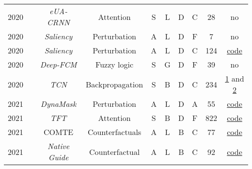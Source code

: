 \begin{table*}[h!]
\begin{tabular}{@{}cccccccccc@{}}
    2020        & \cite{tan_explainable_2021}                 &\textit{\footnotesize{eUA-CRNN}}  & Attention     &S       & L         & D      & C                                & 28                & no\\  

    2020        & \cite{pan_series_2020}           &\textit{Saliency}& Perturbation    &A       & L         & D      & F                       & 7                 & no \\ 

    2020        & \cite{ismail_benchmarking_2020}           &\textit{Saliency}& Perturbation    &A       & L         & D      & C                    & 124               & \href{https://github.com/ayaabdelsalam91/TS-Interpretability-Benchmark}{code}\\ 

    2020        & \cite{wang_deep_2021}           & \textit{\footnotesize{Deep-FCM}}& Fuzzy logic    &S       & G        & D      & F                        & 39                & no\\ 

    2020        & \cite{lauritsen_early_2020}   &\textit{TCN}       &Backpropagation      &S       & B          & D      & C                    & 234               & \href{https://github.com/albermax/innvestigate}{1} and \href{https://github.com/slundberg/shap}{2} \\

    2021        &\cite{crabbe_explaining_2021}    & \textit{DynaMask}     & Perturbation  & A      & L     & D      & A                    & 55            & \href{https://github.com/JonathanCrabbe/Dynamask}{code}   \\ 

    2021        & \cite{lim_temporal_2020}         & \textit{TFT}      & Attention     &S       & B          & D      & F                       & 822               & \href{https://github.com/greatwhiz/tft_tf2}{code}       \\ 

    2021    & \cite{ates_counterfactual_2021}   & COMTE                & Counterfactuals    & A & L & B & C & 77 & \href{https://github.com/peaclab/CoMTE}{code} \\

    2021        & \cite{delaney_instance-based_2021} & \textit{\footnotesize{Native Guide}} & Counterfactual & A & L & B      & C & 92 & \href{https://github.com/e-delaney/Instance-Based_CFE_TSC/tree/main}{code} \\
  

\end{tabular}
\end{table*}
